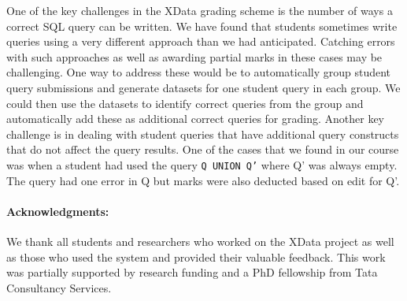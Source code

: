 \documentclass[11pt]{article}
\newcommand{\smalltt}[1]{{{\texttt{#1}}}}
\begin{document}
One of the key challenges in the XData grading scheme is the number of ways a correct SQL query can be written. We have found that students sometimes write queries using a very different approach than we had anticipated. Catching errors with such approaches as well as awarding partial marks in these cases may be challenging. One way to address these would be to automatically group student query submissions and generate datasets for one student query in each group. We could then use the datasets to identify correct queries from the group and automatically add these as additional correct queries for grading. 
Another key challenge is in dealing with student queries that have additional query constructs that do not affect the query results. One of the cases that we found in our course was when a student had used the query {\smalltt{Q UNION Q'}} where Q' was always empty. The query had one error in Q but marks were also deducted based on edit for Q'.  


\paragraph*{Acknowledgments:} We thank all students and researchers who worked on the XData project as well as those who used the system and provided their valuable feedback. This work was partially supported by research funding and a PhD fellowship from Tata Consultancy Services. 
%
%


\end{document}
